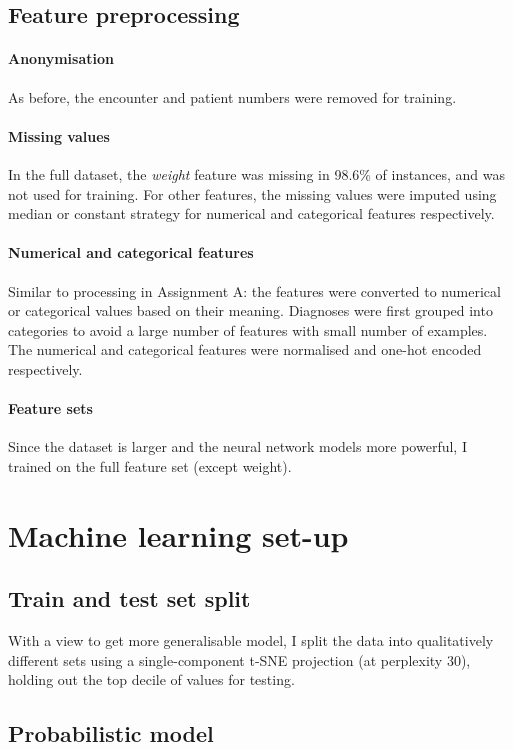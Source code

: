 \documentclass[10pt, twocolumn]{article}
\begin{document}
\subsection{Feature preprocessing}
\paragraph{Anonymisation} As before, the encounter and patient numbers were removed for training.

\paragraph{Missing values} In the full dataset, the \textit{weight} feature was missing in 98.6\% of instances, and was not used for training. For other features, the missing values were imputed using median or constant strategy for numerical and categorical features respectively.

\paragraph{Numerical and categorical features} Similar to processing in Assignment A: the features were converted to numerical or categorical values based on their meaning. Diagnoses were first grouped into categories to avoid a large number of features with small number of examples. The numerical and categorical features were normalised and one-hot encoded respectively.

\paragraph{Feature sets} Since the dataset is larger and the neural network models more powerful, I trained on the full feature set (except weight).

\section{Machine learning set-up}

\subsection{Train and test set split}
With a view to get more generalisable model, I split the data into qualitatively different sets using a single-component t-SNE projection (at perplexity 30), holding out the top decile of values for testing. 


\subsection{Probabilistic model}
\end{document}
